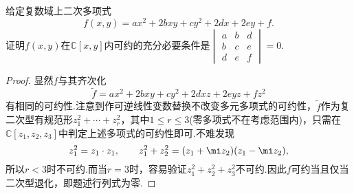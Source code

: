 \begin{prob}[13]
	给定复数域上二次多项式
	\[
		f(x,y)=ax^2+2bxy+cy^2+2dx+2ey+f.
	\]
	证明$f(x,y)$在$\mathbb{C}[x,y]$内可约的充分必要条件是$\begin{vmatrix}
			a & b & d \\
			b & c & e \\
			d & e & f
		\end{vmatrix}=0$.
\end{prob}
\begin{proof}
	显然$f$与其齐次化
	\[
		\tilde{f}=ax^2+2bxy+cy^2+2dxz+2eyz+fz^2
	\]
	有相同的可约性.注意到作可逆线性变数替换不改变多元多项式的可约性，$\tilde{f}$作为复二次型有规范形$z_1^2+\cdots+z_r^2$，其中$1\le r\le 3$(零多项式不在考虑范围内)，只需在$\mathbb{C}[z_1,z_2,z_3]$中判定上述多项式的可约性即可.不难发现
	\[
		z_1^2=z_1\cdot z_1,\qquad z_1^2+z_2^2=(z_1+\mi z_2)(z_1-\mi z_2),
	\]
	所以$r<3$时不可约.而当$r=3$时，容易验证$z_1^2+z_2^2+z_3^2$不可约.因此$f$可约当且仅当二次型退化，即题述行列式为零.
\end{proof}
